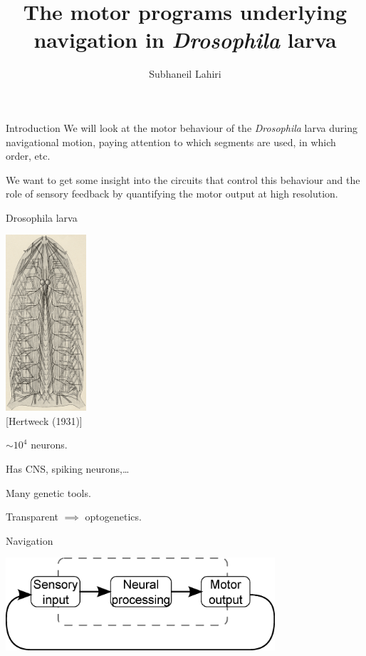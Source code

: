 \documentclass{beamer}%
\title[Muscle usage in \hs s]{The motor programs underlying navigation in \emph{Drosophila} larva}
\author{Subhaneil Lahiri%
}
\institute[Harvard]{%
Harvard University
}
\newcommand{\rref}[1]{\hfill {\small{\color{darkgrey} [#1]}}}
\begin{document}

\begin{frame}
%
 \titlepage
%
\end{frame}


\begin{frame}{Introduction}
%
 We will look at the motor behaviour of the \emph{Drosophila} larva during navigational motion, paying attention to which segments are used, in which order, etc.

 \vp We want to get some insight into the circuits that control this behaviour and the role of sensory feedback by quantifying the motor output at high resolution.

%
\end{frame}



\begin{frame}{Drosophila larva}
%
 \parbox{5cm}{
   \includegraphics[width=3cm]{Figs/HertweckNervousSys.png}\\
   \rref{Hertweck (1931)}
 }
 \parbox{6cm}{
   $\sim10^4$ neurons.

   \vp Has CNS, spiking neurons,\ldots

   \vp Many genetic tools.

   \vp Transparent $\implies$ optogenetics.
 }
%
\end{frame}


\begin{frame}{Navigation}
%
 \begin{center}
   \includegraphics[width=10cm]{Figs/behaviour.eps}
 \end{center}
%
\end{frame}
\end{document}
